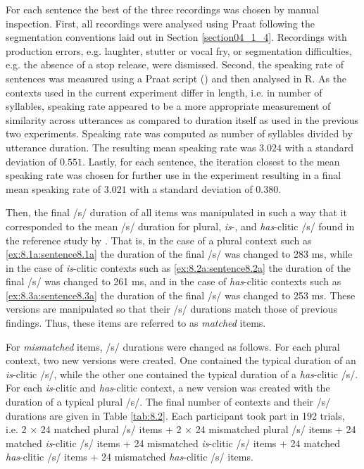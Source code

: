 For each sentence the best of the three recordings was chosen by manual inspection. First, all recordings were analysed using Praat following the segmentation conventions laid out in Section \ref{section04_1_4}. Recordings with production errors, e.g. laughter, stutter or vocal fry, or segmentation difficulties, e.g. the absence of a stop release, were dismissed. Second, the speaking rate of sentences was measured using a Praat script (\cite{deJong2008}) and then analysed in R. As the contexts used in the current experiment differ in length, i.e. in number of syllables, speaking rate appeared to be a more appropriate measurement of similarity across utterances as compared to duration itself as used in the previous two experiments. Speaking rate was computed as number of syllables divided by utterance duration. The resulting mean speaking rate was $3.024$ with a standard deviation of $0.551$. Lastly, for each sentence, the iteration closest to the mean speaking rate was chosen for further use in the experiment resulting in a final mean speaking rate of $3.021$ with a standard deviation of $0.380$.

Then, the final /s/ duration of all items was manipulated in such a way that it corresponded to the mean /s/ duration for plural, \textit{is}-, and \textit{has}-clitic /s/ found in the reference study by \citet{Plag2017}. That is, in the case of a plural context such as \ref{ex:8.1a:sentence8.1a} the duration of the final /s/ was changed to 283 ms, while in the case of \textit{is}-clitic contexts such as \ref{ex:8.2a:sentence8.2a} the duration of the final /s/ was changed to 261 ms, and in the case of \textit{has}-clitic contexts such as \ref{ex:8.3a:sentence8.3a} the duration of the final /s/ was changed to 253 ms. These versions are manipulated so that their /s/ durations match those of previous findings. Thus, these items are referred to as \textit{matched} items.

For \textit{mismatched} items, /s/ durations were changed as follows. For each plural context, two new versions were created. One contained the typical duration of an \textit{is}-clitic /s/, while the other one contained the typical duration of a \textit{has}-clitic /s/. For each \textit{is}-clitic and \textit{has}-clitic context, a new version was created with the duration of a typical plural /s/. The final number of contexts and their /s/ durations are given in Table \ref{tab:8.2}. Each participant took part in 192 trials, i.e. 2 × 24 matched plural /s/ items + 2 × 24 mismatched plural /s/ items + 24 matched \textit{is}-clitic /s/ items + 24 mismatched \textit{is}-clitic /s/ items + 24 matched \textit{has}-clitic /s/ items + 24 mismatched \textit{has}-clitic /s/ items.

